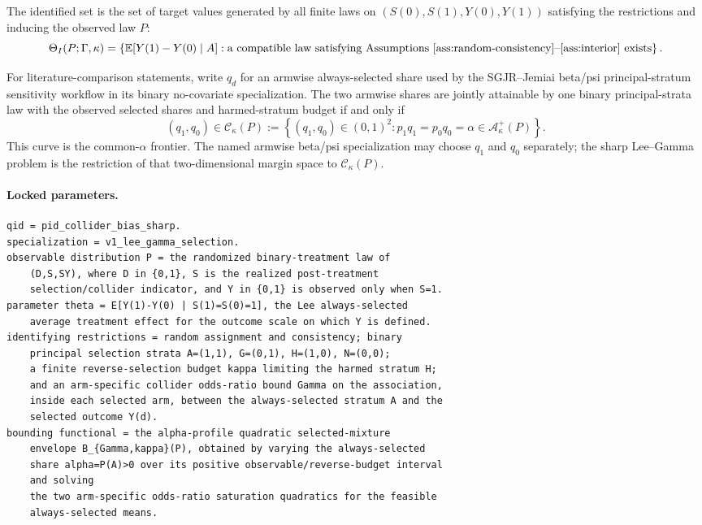\documentclass[11pt]{article}
\newcommand{\E}{\mathbb{E}}
\theoremstyle{definition}
\theoremstyle{plain}
\theoremstyle{remark}
\begin{document}
The identified set is the set of target values generated by all finite laws on
\((S(0),S(1),Y(0),Y(1))\) satisfying the restrictions and inducing the observed
law \(P\):
\[
  \Theta_I(P;\Gamma,\kappa)
  =
  \left\{
    \E[Y(1)-Y(0)\mid A]:
    \text{a compatible law satisfying Assumptions~\ref{ass:random-consistency}--\ref{ass:interior}
    exists}
  \right\}.
\]

For literature-comparison statements, write \(q_d\) for an armwise
always-selected share used by the SGJR--Jemiai beta/psi principal-stratum
sensitivity workflow in its binary no-covariate specialization.  The two
armwise shares are jointly attainable by one binary
principal-strata law with the observed selected shares and harmed-stratum budget
if and only if
\[
  (q_1,q_0)\in\mathcal C_\kappa(P)
  :=
  \left\{
    (q_1,q_0)\in(0,1)^2:
    p_1q_1=p_0q_0=\alpha\in\mathcal A_\kappa^+(P)
  \right\}.
\]
This curve is the common-\(\alpha\) frontier.  The named armwise beta/psi
specialization may choose \(q_1\) and \(q_0\) separately; the sharp Lee--Gamma
problem is the restriction of that two-dimensional margin space to
\(\mathcal C_\kappa(P)\).

\paragraph{Locked parameters.}
\begin{verbatim}
qid = pid_collider_bias_sharp.
specialization = v1_lee_gamma_selection.
observable distribution P = the randomized binary-treatment law of
    (D,S,SY), where D in {0,1}, S is the realized post-treatment
    selection/collider indicator, and Y in {0,1} is observed only when S=1.
parameter theta = E[Y(1)-Y(0) | S(1)=S(0)=1], the Lee always-selected
    average treatment effect for the outcome scale on which Y is defined.
identifying restrictions = random assignment and consistency; binary
    principal selection strata A=(1,1), G=(0,1), H=(1,0), N=(0,0);
    a finite reverse-selection budget kappa limiting the harmed stratum H;
    and an arm-specific collider odds-ratio bound Gamma on the association,
    inside each selected arm, between the always-selected stratum A and the
    selected outcome Y(d).
bounding functional = the alpha-profile quadratic selected-mixture
    envelope B_{Gamma,kappa}(P), obtained by varying the always-selected
    share alpha=P(A)>0 over its positive observable/reverse-budget interval
    and solving
    the two arm-specific odds-ratio saturation quadratics for the feasible
    always-selected means.
\end{verbatim}
\end{document}
